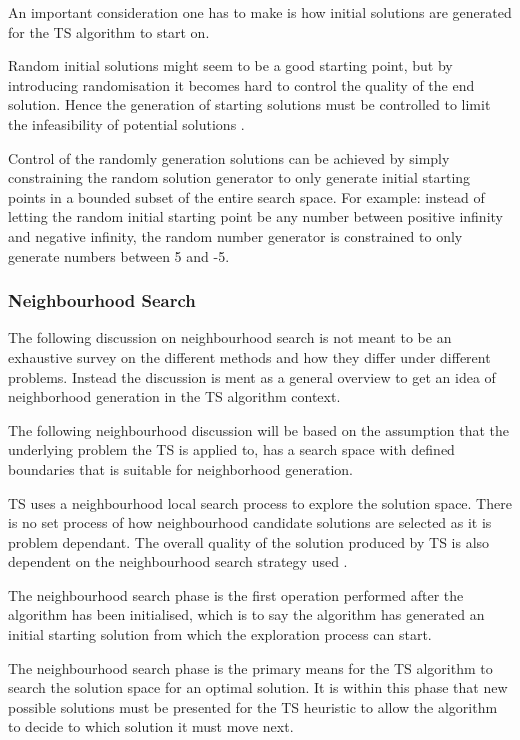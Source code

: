An important consideration one has to make is how initial solutions are generated for the TS algorithm to start on\cite{AIModernApproach,TSHazardous}.

Random initial solutions might seem to be a good starting point, but by introducing randomisation it becomes hard to control the quality of the end solution\cite{TSHazardous}. Hence the generation of starting solutions must be controlled to limit the infeasibility of potential solutions \cite{TSHazardous}. 

Control of the randomly generation solutions can be achieved by simply constraining the random solution generator to only generate initial starting points in a bounded subset of the entire search space. For example: instead of letting the random initial starting point be any number between positive infinity and negative infinity, the random number generator is constrained to only generate numbers between 5 and -5.

\subsubsection{Neighbourhood Search}
The following discussion on neighbourhood search is not meant to be an exhaustive survey on the different methods and how they differ under different problems. Instead the discussion is ment as a general overview to get an idea of neighborhood generation in the TS algorithm context. 

The following neighbourhood discussion will be based on the assumption that the underlying problem the TS is applied to, has a search space with defined boundaries that is suitable for neighborhood generation.

TS uses a neighbourhood local search process to explore the solution space. There is no set process of how neighbourhood candidate solutions are selected as it is problem dependant. The overall quality of the solution produced by TS is also dependent on the neighbourhood search strategy used \cite{TSHazardous}. 

The neighbourhood search phase is the first operation performed after the algorithm has been initialised, which is to say the algorithm has generated an initial starting solution from which the exploration process can start.

The neighbourhood search phase is the primary means for the TS algorithm to search the solution space for an optimal solution. It is within this phase that new possible solutions must be presented for the TS heuristic to allow the algorithm to decide to which solution it must move next.

